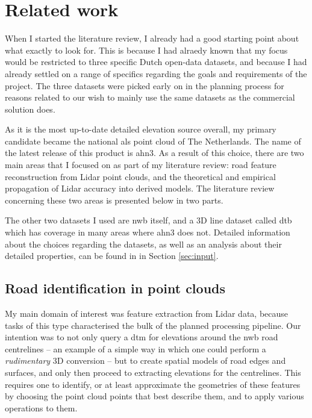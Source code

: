 
\chapter{Related work}
\label{chap:rw}

When I started the literature review, I already had a good starting point about what exactly to look for. This is because I had alraedy known that my focus would be restricted to three specific Dutch open-data datasets, and because I had already settled on a range of specifics regarding the goals and requirements of the project. The three datasets were picked early on in the planning process for reasons related to our wish to mainly use the same datasets as the commercial solution does.

As it is the most up-to-date detailed elevation source overall, my primary candidate became the national \ac{als} point cloud of The Netherlands. The name of the latest release of this product is \ac{ahn3}. As a result of this choice, there are two main areas that I focused on as part of my literature review: road feature reconstruction from Lidar point clouds, and the theoretical and empirical propagation of Lidar accuracy into derived models. The literature review concerning these two areas is presented below in two parts.

The other two datasets I used are \ac{nwb} itself, and a 3D line dataset called \ac{dtb} which has coverage in many areas where \ac{ahn3} does not. Detailed information about the choices regarding the datasets, as well as an analysis about their detailed properties, can be found in in Section \ref{sec:input}.

\section{Road identification in point clouds}
\label{sec:roadidentification}

My main domain of interest was feature extraction from Lidar data, because tasks of this type characterised the bulk of the planned processing pipeline. Our intention was to not only query a \ac{dtm} for elevations around the \ac{nwb} road centrelines – an example of a simple way in which one could perform a \textit{rudimentary} 3D conversion – but to create spatial models of road edges and surfaces, and only then proceed to extracting elevations for the centrelines. This requires one to identify, or at least approximate the geometries of these features by choosing the point cloud points that best describe them, and to apply various operations to them.

